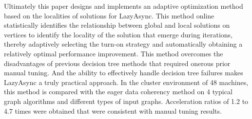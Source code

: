 Ultimately this paper designs and implements an adaptive optimization method 
based on  the localities of  solutions for LazyAsync.
This method online statistically identifies the relationship 
between global and local solutions on vertices 
to identify the locality of the solution that emerge during iterations, 
thereby adaptively selecting the turn-on strategy and 
automatically obtaining a relatively optimal performance improvement.
This method overcomes the disadvantages of previous decision tree methods that required onerous prior manual tuning.
And the ability to effectively handle decision tree failures makes LazyAsync a truly practical approach.
In the cluster environment of 48 machines, this method is compared with the eager data coherency method 
on 4 typical graph algorithms and different types of input graphs.
Acceleration ratios of 1.2 to 4.7 times were obtained that were consistent with manual tuning results.




